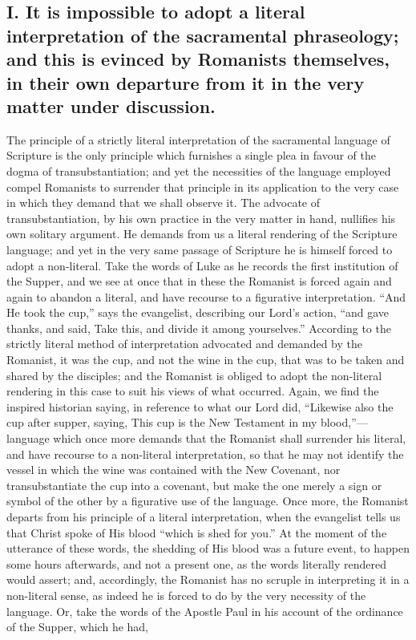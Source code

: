 \documentclass[]{book}
\begin{document}
\hypertarget{i.-it-is-impossible-to-adopt-a-literal-interpretation-of-the-sacramental-phraseology-and-this-is-evinced-by-romanists-themselves-in-their-own-departure-from-it-in-the-very-matter-under-discussion.}{%
\subsection{I. It is impossible to adopt a literal interpretation of the sacramental phraseology; and this is evinced by Romanists themselves, in their own departure from it in the very matter under discussion.}\label{i.-it-is-impossible-to-adopt-a-literal-interpretation-of-the-sacramental-phraseology-and-this-is-evinced-by-romanists-themselves-in-their-own-departure-from-it-in-the-very-matter-under-discussion.}}

The principle of a strictly literal interpretation of the sacramental language of Scripture is the only principle which furnishes a single plea in favour of the dogma of transubstantiation; and yet the necessities of the language employed compel Romanists to surrender that principle in its application to the very case in which they demand that we shall observe it. The advocate of transubstantiation, by his own practice in the very matter in hand, nullifies his own solitary argument. He demands from us a literal rendering of the Scripture language; and yet in the very same passage of Scripture he is himself forced to adopt a non-literal. Take the words of Luke as he records the first institution of the Supper, and we see at once that in these the Romanist is forced again and again to abandon a literal, and have recourse to a figurative interpretation. ``And He took the cup,'' says the evangelist, describing our Lord's action, ``and gave thanks, and said, Take this, and divide it among yourselves.'' According to the strictly literal method of interpretation advocated and demanded by the Romanist, it was the cup, and not the wine in the cup, that was to be taken and shared by the disciples; and the Romanist is obliged to adopt the non-literal rendering in this case to suit his views of what occurred. Again, we find the inspired historian saying, in reference to what our Lord did, ``Likewise also the cup after supper, saying, This cup is the New Testament in my blood,''---language which once more demands that the Romanist shall surrender his literal, and have recourse to a non-literal interpretation, so that he may not identify the vessel in which the wine was contained with the New Covenant, nor transubstantiate the cup into a covenant, but make the one merely a sign or symbol of the other by a figurative use of the language. Once more, the Romanist departs from his principle of a literal interpretation, when the evangelist tells us that Christ spoke of His blood ``which is shed for you.'' At the moment of the utterance of these words, the shedding of His blood was a future event, to happen some hours afterwards, and not a present one, as the words literally rendered would assert; and, accordingly, the Romanist has no scruple in interpreting it in a non-literal sense, as indeed he is forced to do by the very necessity of the language. Or, take the words of the Apostle Paul in his account of the ordinance of the Supper, which he had, 
\end{document}
